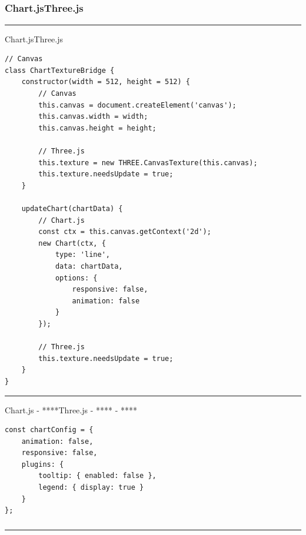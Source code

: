 \subsection{}\label{section-5}

\subsubsection{Chart.jsThree.js}\label{chart.jsthree.js-1}

\begin{center}\rule{0.5\linewidth}{0.5pt}\end{center}

Chart.jsThree.js

\begin{verbatim}
// Canvas
class ChartTextureBridge {
    constructor(width = 512, height = 512) {
        // Canvas
        this.canvas = document.createElement('canvas');
        this.canvas.width = width;
        this.canvas.height = height;
        
        // Three.js
        this.texture = new THREE.CanvasTexture(this.canvas);
        this.texture.needsUpdate = true;
    }
    
    updateChart(chartData) {
        // Chart.js
        const ctx = this.canvas.getContext('2d');
        new Chart(ctx, {
            type: 'line',
            data: chartData,
            options: {
                responsive: false,
                animation: false
            }
        });
        
        // Three.js
        this.texture.needsUpdate = true;
    }
}
\end{verbatim}

\begin{center}\rule{0.5\linewidth}{0.5pt}\end{center}

Chart.js - ****Three.js - **** - ****

\begin{verbatim}
const chartConfig = {
    animation: false,
    responsive: false,
    plugins: {
        tooltip: { enabled: false },
        legend: { display: true }
    }
};
\end{verbatim}

\subsubsection{}\label{section-6}

\begin{center}\rule{0.5\linewidth}{0.5pt}\end{center}

